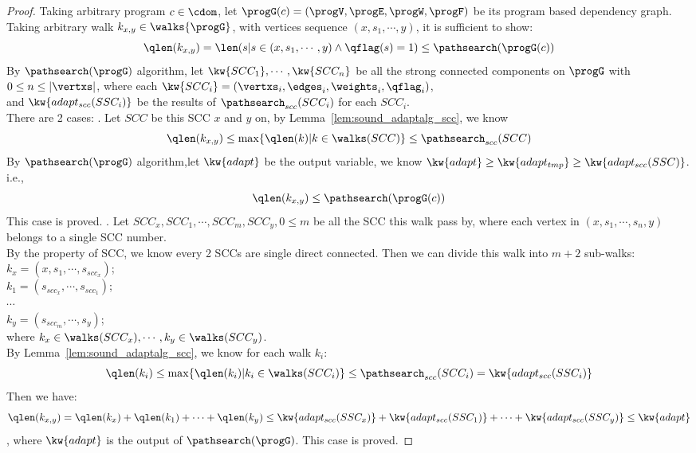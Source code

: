 \begin{proof}
  Taking arbitrary program $c \in \cdom$, let $\progG(c) = (\progV, \progE, \progW, \progF)$ be its 
  program based dependency graph.
  Taking arbitrary walk $k_{x,y} \in \walks{\progG}$, with vertices sequence
  $(x, s_1, \cdots, y)$, it is sufficient to show:
  \[
    \qlen(k_{x,y}) = \len(s | s \in (x, s_1, \cdots, y) \land \qflag(s) = 1) \leq \pathsearch(\progG(c))
  \]
  By $\pathsearch(\progG)$ algorithm, let $\kw{SCC_1}, \cdots, \kw{SCC_n}$ be all the strong connected components on $\progG$ with $0 \leq n \leq |\vertxs|$,
  where each $\kw{SCC_i} = (\vertxs_i, \edges_i, \weights_i, \qflag_i)$,
  \\
  and $\kw{adapt_{scc}(SSC_i)}$ be the results of $\pathsearch_{scc}(SCC_i)$ for each $SCC_i$.
  \\
  There are 2 cases:
  .
  Let  $SCC$ be this SCC $x$ and $y$ on, by Lemma~\ref{lem:sound_adaptalg_scc}, we know
  \[
    \qlen(k_{x,y}) \leq \max\{\qlen(k) | k \in \walks(SCC)\} \leq \pathsearch_{scc}(SCC)
  \]
%
By $\pathsearch(\progG)$ algorithm,let $\kw{adapt}$ be the output variable,
we know $\kw{adapt} \geq \kw{adapt_{tmp}} \geq  \kw{adapt_{scc}(SSC)} $.
\\
i.e., 
\[
  \qlen(k_{x,y}) \leq \pathsearch(\progG(c)) 
  \]
This case is proved.
%
%
.
Let $SCC_x, SCC_1, \cdots, SCC_m, SCC_y, 0 \leq m$ be all the SCC this walk pass by, where each vertex in 
$(x, s_1, \cdots, s_n, y) $ belongs to a single SCC number. 
\\
By the property of SCC, we know every 2 SCCs are single direct connected. Then we can divide this walk into $m+2$ sub-walks:
\\
$k_x = (x, s_1, \cdots, s_{scc_x})$;
\\
$k_1 = (s_{scc_x}, \cdots, s_{scc_1})$;
\\
$\cdots$
\\
$k_y = (s_{scc_m}, \cdots, s_y)$;
\\
where $k_x \in \walks(SCC_x), \cdots, k_y \in \walks(SCC_y)$.
\\
By Lemma~\ref{lem:sound_adaptalg_scc}, we know for each walk $k_i$:
\[ \qlen(k_i) \leq \max\{\qlen(k_i) | k_i \in \walks(SCC_i)\} \leq \pathsearch_{scc}(SCC_i) = \kw{adapt_{scc}(SSC_i)} \]
%
Then we have:
\[ 
  \qlen(k_{x,y}) = \qlen(k_x) + \qlen(k_1) + \cdots + \qlen(k_y) \leq 
  \kw{adapt_{scc}(SSC_x)} + \kw{adapt_{scc}(SSC_1)}  + \cdots + \kw{adapt_{scc}(SSC_y)}
  \leq \kw{adapt}
  \]
, where $\kw{adapt}$ is the output of $\pathsearch(\progG)$.
This case is proved.
\end{proof}

